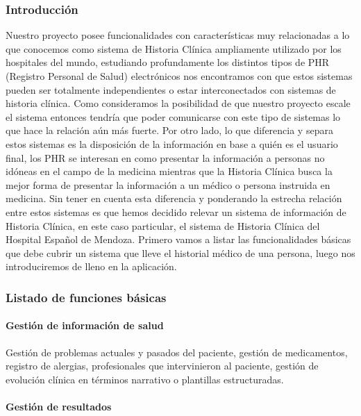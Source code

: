 {\correccionTexto
\subsubsection{Introducción}
Nuestro proyecto posee funcionalidades con características muy relacionadas a lo que conocemos como sistema de Historia Clínica ampliamente utilizado por los hospitales del mundo, estudiando profundamente los distintos tipos de PHR (Registro Personal de Salud) electrónicos nos encontramos con que estos sistemas pueden ser totalmente independientes o estar interconectados con sistemas de historia clínica. Como consideramos la posibilidad de que nuestro proyecto escale el sistema entonces tendría que poder comunicarse con este tipo de sistemas lo que hace la relación aún más fuerte. Por otro lado, lo que diferencia y separa estos sistemas es la disposición de la información en base a quién es el usuario final, los PHR se interesan en como presentar la información a personas no idóneas en el campo de la medicina mientras que la Historia Clínica busca la mejor forma de presentar la información a un médico o persona instruida en medicina. Sin tener en cuenta esta diferencia y ponderando la estrecha relación entre estos sistemas es que hemos decidido relevar un sistema de información de Historia Clínica, en este caso particular, el sistema de Historia Clínica del Hospital Español de Mendoza.
Primero vamos a listar las funcionalidades básicas que debe cubrir un sistema que lleve el historial médico de una persona, luego nos introduciremos de lleno en la aplicación.
}

\subsubsection{Listado de funciones básicas}

\paragraph{Gestión de información de salud}

Gestión de problemas actuales y pasados del paciente, gestión de medicamentos, registro de alergias, profesionales que intervinieron al paciente, gestión de evolución clínica en términos narrativo o plantillas estructuradas.

\paragraph{Gestión de resultados}

